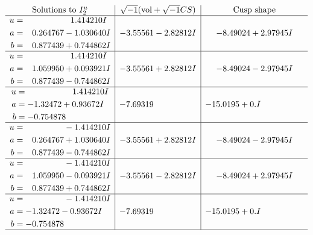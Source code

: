 \documentclass[1p]{elsarticle_modified}
\theoremstyle{definition}
\newcommand{\I}{\sqrt{-1}}
\begin{document}
$$\begin{array}{c|c|c}  
\text{Solutions to }I^u_{2}& \I (\text{vol} + \sqrt{-1}CS) & \text{Cusp shape}\\
 \hline 
\begin{aligned}
u &= \phantom{-0.000000 -}1.414210 I \\
a &= \phantom{-}0.264767 - 1.030640 I \\
b &= \phantom{-}0.877439 + 0.744862 I\end{aligned}
 & -3.55561 - 2.82812 I & -8.49024 + 2.97945 I \\ \hline\begin{aligned}
u &= \phantom{-0.000000 -}1.414210 I \\
a &= \phantom{-}1.059950 + 0.093921 I \\
b &= \phantom{-}0.877439 - 0.744862 I\end{aligned}
 & -3.55561 + 2.82812 I & -8.49024 - 2.97945 I \\ \hline\begin{aligned}
u &= \phantom{-0.000000 -}1.414210 I \\
a &= -1.32472 + 0.93672 I \\
b &= -0.754878\phantom{ +0.000000I}\end{aligned}
 & -7.69319\phantom{ +0.000000I} & -15.0195 + 0. I\phantom{ +0.000000I} \\ \hline\begin{aligned}
u &= \phantom{-0.000000 } -1.414210 I \\
a &= \phantom{-}0.264767 + 1.030640 I \\
b &= \phantom{-}0.877439 - 0.744862 I\end{aligned}
 & -3.55561 + 2.82812 I & -8.49024 - 2.97945 I \\ \hline\begin{aligned}
u &= \phantom{-0.000000 } -1.414210 I \\
a &= \phantom{-}1.059950 - 0.093921 I \\
b &= \phantom{-}0.877439 + 0.744862 I\end{aligned}
 & -3.55561 - 2.82812 I & -8.49024 + 2.97945 I \\ \hline\begin{aligned}
u &= \phantom{-0.000000 } -1.414210 I \\
a &= -1.32472 - 0.93672 I \\
b &= -0.754878\phantom{ +0.000000I}\end{aligned}
 & -7.69319\phantom{ +0.000000I} & -15.0195 + 0. I\phantom{ +0.000000I}\\
 \hline 
 \end{array}$$\newpage\newpage\renewcommand{\arraystretch}{1}
\end{document}
